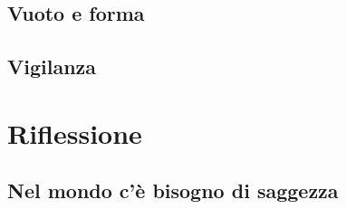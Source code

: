 \documentclass[11pt,twoside,final]{memoir}
\begin{document}
\chapter{Vuoto e forma}


\chapter{Vigilanza}



\part{Riflessione}

\chapter{Nel mondo c'è bisogno di saggezza}



%
%
%
%


% 
% 
% 
% 
% 
% 
% 
% 


\cleartorecto
\thispagestyle{plain}


\cleartoverso
\thispagestyle{plain}

\end{document}
